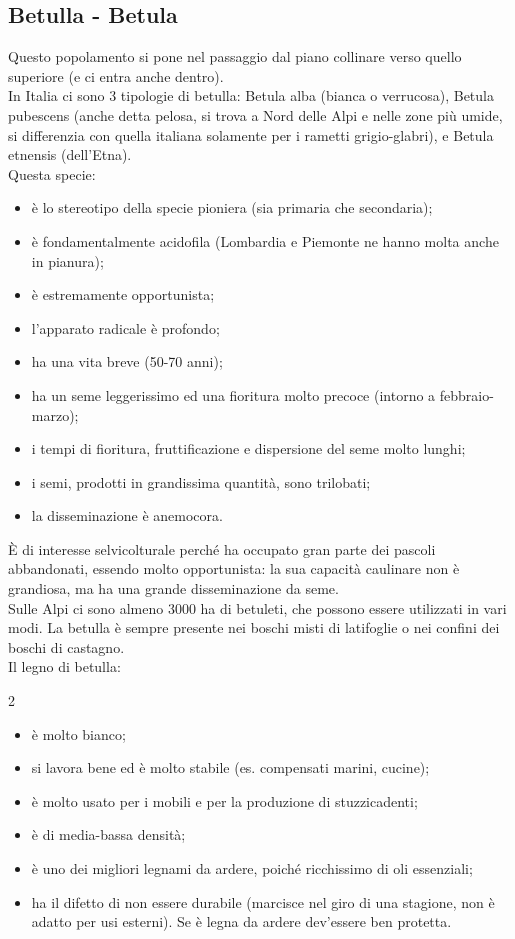 \subsection{Betulla - Betula}
Questo popolamento si pone nel passaggio dal piano collinare verso quello superiore (e ci entra anche dentro).\\
In Italia ci sono 3 tipologie di betulla: Betula alba (bianca o verrucosa), Betula pubescens (anche detta pelosa, si trova a Nord delle Alpi e nelle zone più umide, si differenzia con quella italiana solamente per i rametti grigio-glabri), e Betula etnensis (dell'Etna).\\
Questa specie:
\begin{itemize}[nosep]
    \item è lo stereotipo della specie pioniera (sia primaria che secondaria);
    \item è fondamentalmente acidofila (Lombardia e Piemonte ne hanno molta anche in pianura);
    \item è estremamente opportunista;
    \item l'apparato radicale è profondo;
    \item ha una vita breve (50-70 anni); 
    \item ha un seme leggerissimo ed una fioritura molto precoce (intorno a febbraio-marzo);
    \item i tempi di fioritura, fruttificazione e dispersione del seme molto lunghi;
    \item i semi, prodotti in grandissima quantità, sono trilobati;
    \item la disseminazione è anemocora.
\end{itemize}
È di interesse selvicolturale perché ha occupato gran parte dei pascoli abbandonati, essendo molto opportunista: la sua capacità caulinare non è grandiosa, ma ha una grande disseminazione da seme.\\
Sulle Alpi ci sono almeno 3000 ha di betuleti, che possono essere utilizzati in vari modi. La betulla è sempre presente nei boschi misti di latifoglie o nei confini dei boschi di castagno.\\
Il legno di betulla:
\begin{multicols}{2}
\begin{itemize}[nosep]
    \item è molto bianco;
    \item si lavora bene ed è molto stabile (es. compensati marini, cucine);
    \item è molto usato per i mobili e per la produzione di stuzzicadenti;
    \item è di media-bassa densità;
    \item è uno dei migliori legnami da ardere, poiché ricchissimo di oli essenziali;
    \item ha il difetto di non essere durabile (marcisce nel giro di una stagione, non è adatto per usi esterni). Se è legna da ardere dev'essere ben protetta.
\end{itemize}
\end{multicols}
